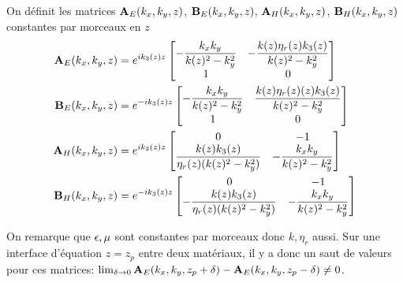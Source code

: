       \begin{defn}
        On définit les matrices \(\mathbf{A}_{E}(k_x,k_y,z)\), \(\mathbf{B}_{E}(k_x,k_y,z)\), \(\mathbf{A}_{H}(k_x,k_y,z)\), \(\mathbf{B}_{H}(k_x,k_y,z)\) constantes par morceaux en \(z\)
        \begin{align*}
          \mathbf{A}_{E}(k_x,k_y,z) &= e^{ik_3(z)z}
          \begin{bmatrix}
            -\dfrac{k_xk_y}{k(z)^2 - k_y^2} & -\dfrac{k(z)\eta_r(z)k_3(z)}{k(z)^2 - k_y^2}
            \\
            1 & 0
          \end{bmatrix}
          \\
          \mathbf{B}_{E}(k_x,k_y,z) &= e^{-ik_3(z)z}
          \begin{bmatrix}
            -\dfrac{k_xk_y}{k(z)^2 - k_y^2} & \dfrac{k(z)\eta_r(z)(z) k_3(z)}{k(z)^2 - k_y^2}
            \\
            1 & 0
          \end{bmatrix}
          \\
          \mathbf{A}_{H}(k_x,k_y,z) &= e^{ik_3(z)z}
          \begin{bmatrix}
            0 & -1
            \\
            \dfrac{k(z)k_3(z)}{\eta_r(z)(k(z)^2 - k_y^2)} & -\dfrac{k_xk_y}{k(z)^2 - k_y^2}
          \end{bmatrix}
          \\
          \mathbf{B}_{H}(k_x,k_y,z) &= e^{-ik_3(z)z}
          \begin{bmatrix}
            0 & -1
            \\
            -\dfrac{k(z)k_3(z)}{\eta_r(z)(k(z)^2 - k_y^2)} & -\dfrac{k_xk_y}{k(z)^2 - k_y^2}
          \end{bmatrix}
        \end{align*}
      \end{defn}
      On remarque que \(\epsilon,\mu\) sont constantes par morceaux donc \(k,\eta_r\) aussi.
      Sur une interface d'équation \(z=z_p\) entre deux matériaux, il y a donc un saut de valeurs pour ces matrices: \(\lim_{\delta\rightarrow 0 } \mathbf{A}_E(k_x,k_y,z_p+ \delta) - \mathbf{A}_E(k_x,k_y,z_p - \delta) \not = 0\).
